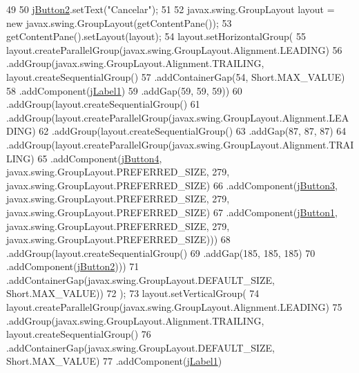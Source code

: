 \begin{DoxyCode}
49 
50         \mbox{\hyperlink{classinterfacessoguar_1_1cu1617_a47c3aa6c8836a1ff965ecef05f6d0e2f}{jButton2}}.setText(\textcolor{stringliteral}{"Cancelar"});
51 
52         javax.swing.GroupLayout layout = \textcolor{keyword}{new} javax.swing.GroupLayout(getContentPane());
53         getContentPane().setLayout(layout);
54         layout.setHorizontalGroup(
55             layout.createParallelGroup(javax.swing.GroupLayout.Alignment.LEADING)
56             .addGroup(javax.swing.GroupLayout.Alignment.TRAILING, layout.createSequentialGroup()
57                 .addContainerGap(54, Short.MAX\_VALUE)
58                 .addComponent(\mbox{\hyperlink{classinterfacessoguar_1_1cu1617_ae976dd2eb4ea08817085c2704c78c3ef}{jLabel1}})
59                 .addGap(59, 59, 59))
60             .addGroup(layout.createSequentialGroup()
61                 .addGroup(layout.createParallelGroup(javax.swing.GroupLayout.Alignment.LEADING)
62                     .addGroup(layout.createSequentialGroup()
63                         .addGap(87, 87, 87)
64                         .addGroup(layout.createParallelGroup(javax.swing.GroupLayout.Alignment.TRAILING)
65                             .addComponent(\mbox{\hyperlink{classinterfacessoguar_1_1cu1617_a8a8f5dee729cb00cabe4a95e51011050}{jButton4}}, javax.swing.GroupLayout.PREFERRED\_SIZE, 279, 
      javax.swing.GroupLayout.PREFERRED\_SIZE)
66                             .addComponent(\mbox{\hyperlink{classinterfacessoguar_1_1cu1617_ab6bee6d7b3c436f015dc73e19b861fe4}{jButton3}}, javax.swing.GroupLayout.PREFERRED\_SIZE, 279, 
      javax.swing.GroupLayout.PREFERRED\_SIZE)
67                             .addComponent(\mbox{\hyperlink{classinterfacessoguar_1_1cu1617_a50f641f67c27a9b417d476ee81a6d982}{jButton1}}, javax.swing.GroupLayout.PREFERRED\_SIZE, 279, 
      javax.swing.GroupLayout.PREFERRED\_SIZE)))
68                     .addGroup(layout.createSequentialGroup()
69                         .addGap(185, 185, 185)
70                         .addComponent(\mbox{\hyperlink{classinterfacessoguar_1_1cu1617_a47c3aa6c8836a1ff965ecef05f6d0e2f}{jButton2}})))
71                 .addContainerGap(javax.swing.GroupLayout.DEFAULT\_SIZE, Short.MAX\_VALUE))
72         );
73         layout.setVerticalGroup(
74             layout.createParallelGroup(javax.swing.GroupLayout.Alignment.LEADING)
75             .addGroup(javax.swing.GroupLayout.Alignment.TRAILING, layout.createSequentialGroup()
76                 .addContainerGap(javax.swing.GroupLayout.DEFAULT\_SIZE, Short.MAX\_VALUE)
77                 .addComponent(\mbox{\hyperlink{classinterfacessoguar_1_1cu1617_ae976dd2eb4ea08817085c2704c78c3ef}{jLabel1}})

\end{DoxyCode}
